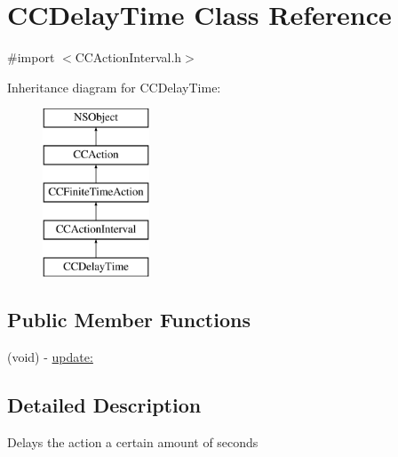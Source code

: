 \hypertarget{interface_c_c_delay_time}{\section{C\-C\-Delay\-Time Class Reference}
\label{interface_c_c_delay_time}
}


{\ttfamily \#import $<$C\-C\-Action\-Interval.\-h$>$}

Inheritance diagram for C\-C\-Delay\-Time\-:\begin{figure}[H]
\begin{center}
\leavevmode
\includegraphics[height=5.000000cm]{interface_c_c_delay_time}
\end{center}
\end{figure}
\subsection*{Public Member Functions}
\begin{DoxyCompactItemize}
\item 
(void) -\/ \hyperlink{interface_c_c_delay_time_aaa5640c9e87dcb73cf94dca6fe104d04}{update\-:}
\end{DoxyCompactItemize}


\subsection{Detailed Description}
Delays the action a certain amount of seconds 

